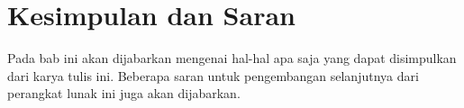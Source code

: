 \chapter{Kesimpulan dan Saran}
\label{chap:kesimpulansaran}

Pada bab ini akan dijabarkan mengenai hal-hal apa saja yang dapat disimpulkan dari karya tulis ini.
Beberapa saran untuk pengembangan selanjutnya dari perangkat lunak ini juga akan dijabarkan.
